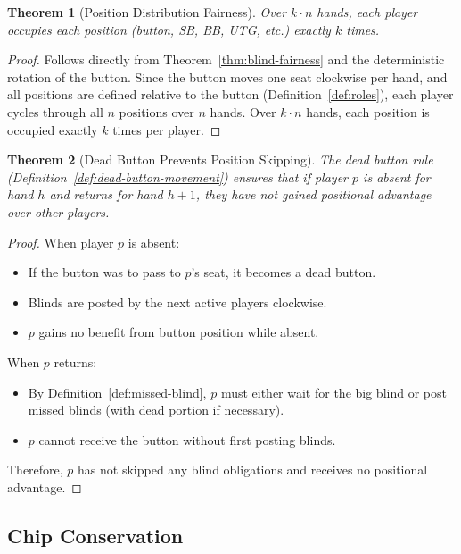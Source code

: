 \documentclass[11pt,a4paper]{article}
\newtheorem{theorem}{Theorem}[section]
\begin{document}
\begin{theorem}[Position Distribution Fairness]
\label{thm:position-fairness}
Over $k \cdot n$ hands, each player occupies each position (button, SB, BB, UTG, etc.) exactly $k$ times.
\end{theorem}

\begin{proof}
Follows directly from Theorem~\ref{thm:blind-fairness} and the deterministic rotation of the button. Since the button moves one seat clockwise per hand, and all positions are defined relative to the button (Definition~\ref{def:roles}), each player cycles through all $n$ positions over $n$ hands. Over $k \cdot n$ hands, each position is occupied exactly $k$ times per player.
\end{proof}

\begin{theorem}[Dead Button Prevents Position Skipping]
\label{thm:dead-button-noskip}
The dead button rule (Definition~\ref{def:dead-button-movement}) ensures that if player $p$ is absent for hand $h$ and returns for hand $h+1$, they have not gained positional advantage over other players.
\end{theorem}

\begin{proof}
When player $p$ is absent:
\begin{itemize}
    \item If the button was to pass to $p$'s seat, it becomes a dead button.
    \item Blinds are posted by the next active players clockwise.
    \item $p$ gains no benefit from button position while absent.
\end{itemize}
When $p$ returns:
\begin{itemize}
    \item By Definition~\ref{def:missed-blind}, $p$ must either wait for the big blind or post missed blinds (with dead portion if necessary).
    \item $p$ cannot receive the button without first posting blinds.
\end{itemize}
Therefore, $p$ has not skipped any blind obligations and receives no positional advantage.
\end{proof}

\subsection{Chip Conservation}
\end{document}
